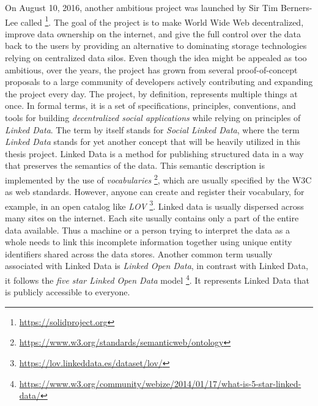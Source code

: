 On August 10, 2016, another ambitious project was launched by Sir Tim Berners-Lee called \solid{} \footnote{\url{https://solidproject.org}}. The goal of the project is to make World Wide Web decentralized, improve data ownership on the internet, and give the full control over the data back to the users by providing an alternative to dominating storage technologies relying on centralized data silos. Even though the idea might be appealed as too ambitious, over the years, the project has grown from several proof-of-concept proposals to a large community of developers actively contributing and expanding the project every day. The \solid{} project, by definition, represents multiple things at once. In formal terms, it is a set of specifications, principles, conventions, and tools for building \textit{decentralized social applications} while relying on principles of \textit{Linked Data}. The term \solid{} by itself stands for \textit{Social Linked Data}, where the term \textit{Linked Data} stands for yet another concept that will be heavily utilized in this thesis project. Linked Data is a method for publishing structured data in a way that preserves the semantics of the data. This semantic description is implemented by the use of \textit{vocabularies} \footnote{\url{https://www.w3.org/standards/semanticweb/ontology}}, which are usually specified by the \acrshort{W3C} as web standards. However, anyone can create and register their vocabulary, for example, in an open catalog like \textit{\gls{LOV}} \footnote{\url{https://lov.linkeddata.es/dataset/lov/}}. Linked data is usually dispersed across many sites on the internet. Each site usually contains only a part of the entire data available. Thus a machine or a person trying to interpret the data as a whole needs to link this incomplete information together using unique entity identifiers shared across the data stores. Another common term usually associated with Linked Data is \textit{Linked Open Data}, in contrast with Linked Data, it follows the \textit{five star Linked Open Data} model \footnote{\url{https://www.w3.org/community/webize/2014/01/17/what-is-5-star-linked-data/}}. It represents Linked Data that is publicly accessible to everyone.

